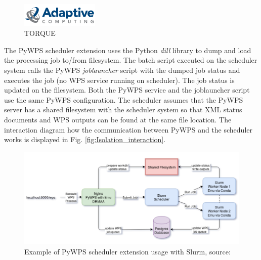\begin{figure}[h!]
\centering
\begin{floatrow}
\end{floatrow}
\end{figure}

\begin{figure}[h!]
\centering
\includegraphics[width=0.33\textwidth]{img/Isolation_torque.png}
\caption{TORQUE}
\label{fig:Isolation_torque}
\end{figure}
\bigskip

The PyWPS scheduler extension uses the Python \textit{dill} library to dump and load the processing job to/from filesystem. The batch script executed on the scheduler system calls the PyWPS \textit{joblauncher} script with the dumped job status and executes the job (no WPS service running on scheduler). The job status is updated on the filesystem. Both the PyWPS service and the joblauncher script use the same PyWPS configuration. The scheduler assumes that the PyWPS server has a shared filesystem with the scheduler system so that XML status documents and WPS outputs can be found at the same file location. The interaction diagram how the communication between PyWPS and the scheduler works is displayed in Fig. \ref{fig:Isolation_interaction}.

\bigskip
\begin{figure}[h!]
\centering
\includegraphics[width=\textwidth]{img/Isolation_slurm_usage.png}
\caption{Example of PyWPS scheduler extension usage with Slurm, source: \cite{PyWPS_docs}}
\label{fig:Isolation_slurm_usage}
\end{figure}

